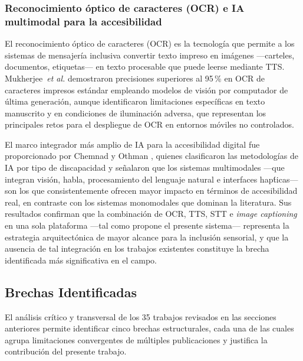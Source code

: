 \documentclass[journal]{IEEEtran}
\begin{document}
	\subsubsection{Reconocimiento \'optico de caracteres (OCR) e IA multimodal para la accesibilidad}
	El reconocimiento \'optico de caracteres (OCR) es la tecnolog\'ia que permite a los sistemas de mensajer\'ia inclusiva convertir texto impreso en im\'agenes ---carteles, documentos, etiquetas--- en texto procesable que puede leerse mediante TTS. Mukherjee~\textit{et al.} \cite{mukherjee2023} demostraron precisiones superiores al 95\,\% en OCR de caracteres impresos est\'andar empleando modelos de visi\'on por computador de \'ultima generaci\'on, aunque identificaron limitaciones espec\'ificas en texto manuscrito y en condiciones de iluminaci\'on adversa, que representan los principales retos para el despliegue de OCR en entornos m\'oviles no controlados.
	
	El marco integrador m\'as amplio de IA para la accesibilidad digital fue proporcionado por Chemnad y Othman \cite{chemnad2024}, quienes clasificaron las metodolog\'ias de IA por tipo de discapacidad y se\~nalaron que los sistemas multimodales ---que integran visi\'on, habla, procesamiento del lenguaje natural e interfaces hap\'ticas--- son los que consistentemente ofrecen mayor impacto en t\'erminos de accesibilidad real, en contraste con los sistemas monomodales que dominan la literatura. Sus resultados confirman que la combinaci\'on de OCR, TTS, STT e \textit{image captioning} en una sola plataforma ---tal como propone el presente sistema--- representa la estrategia arquitect\'onica de mayor alcance para la inclusi\'on sensorial, y que la ausencia de tal integraci\'on en los trabajos existentes constituye la brecha identificada m\'as significativa en el campo.
	
	\subsection{Brechas Identificadas}
	El an\'alisis cr\'itico y transversal de los 35 trabajos revisados en las secciones anteriores permite identificar cinco brechas estructurales, cada una de las cuales agrupa limitaciones convergentes de m\'ultiples publicaciones y justifica la contribuci\'on del presente trabajo.
	
\end{document}
